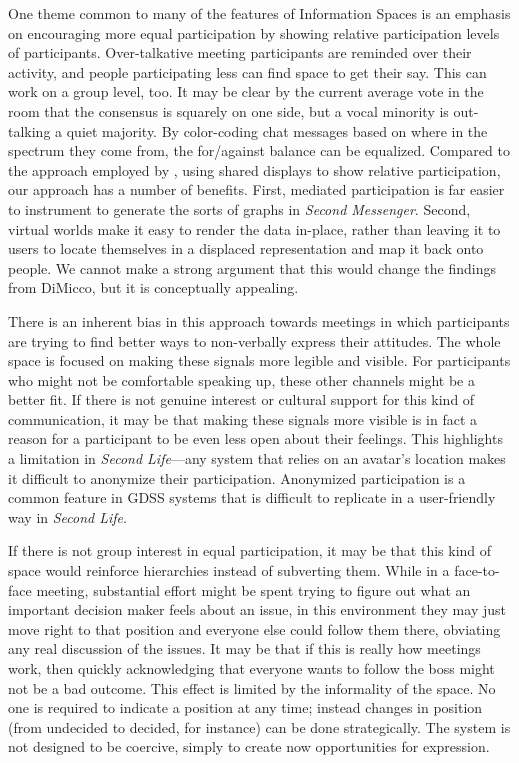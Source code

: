 One theme common to many of the features of Information Spaces is an emphasis on encouraging more equal participation by showing relative participation levels of participants. Over-talkative meeting participants are reminded over their activity, and people participating less can find space to get their say. This can work on a group level, too. It may be clear by the current average vote in the room that the consensus is squarely on one side, but a vocal minority is out-talking a quiet majority. By color-coding chat messages based on where in the spectrum they come from, the for/against balance can be equalized. Compared to the approach employed by \citet{DiMicco:2007ie}, using shared displays to show relative participation, our approach has a number of benefits. First, mediated participation is far easier to instrument to generate the sorts of graphs in \emph{Second Messenger}. Second, virtual worlds make it easy to render the data in-place, rather than leaving it to users to locate themselves in a displaced representation and map it back onto people. We cannot make a strong argument that this would change the findings from DiMicco, but it is conceptually appealing.

There is an inherent bias in this approach towards meetings in which participants are trying to find better ways to non-verbally express their attitudes. The whole space is focused on making these signals more legible and visible. For participants who might not be comfortable speaking up, these other channels might be a better fit. If there is not genuine interest or cultural support for this kind of communication, it may be that making these signals more visible is in fact a reason for a participant to be even less open about their feelings. This highlights a limitation in \emph{Second Life}---any system that relies on an avatar's location makes it difficult to anonymize their participation. Anonymized participation is a common feature in GDSS systems that is difficult to replicate in a user-friendly way in \emph{Second Life}.

If there is not group interest in equal participation, it may be that this kind of space would reinforce hierarchies instead of subverting them. While in a face-to-face meeting, substantial effort might be spent trying to figure out what an important decision maker feels about an issue, in this environment they may just move right to that position and everyone else could follow them there, obviating any real discussion of the issues. It may be that if this is really how meetings work, then quickly acknowledging that everyone wants to follow the boss might not be a bad outcome. This effect is limited by the informality of the space. No one is required to indicate a position at any time; instead changes in position (from undecided to decided, for instance) can be done strategically. The system is not designed to be coercive, simply to create now opportunities for expression. 


